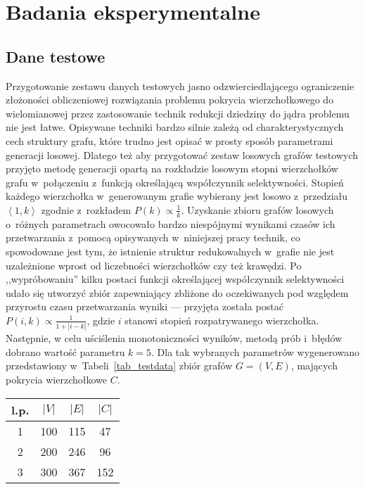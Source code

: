 \chapter{Badania eksperymentalne}
\label{results}
\section{Dane testowe}
\par{
  Przygotowanie zestawu danych testowych jasno odzwierciedlającego ograniczenie złożoności obliczeniowej rozwiązania problemu pokrycia wierzchołkowego do wielomianowej przez zastosowanie technik redukcji dziedziny do jądra problemu nie jest łatwe.
  Opisywane techniki bardzo silnie zależą od charakterystycznych cech struktury grafu, które trudno jest opisać w prosty sposób parametrami generacji losowej.
  Dlatego też aby przygotować zestaw losowych grafów testowych przyjęto metodę generacji opartą na rozkładzie losowym stopni wierzchołków grafu w~połączeniu z~funkcją określającą współczynnik selektywności.
  Stopień każdego wierzchołka w~generowanym grafie wybierany jest losowo z~przedziału $\left<1, k\right>$ zgodnie z~rozkładem $P(k) \propto \frac{1}{k}$.
  Uzyskanie zbioru grafów losowych o~różnych parametrach owocowało bardzo niespójnymi wynikami czasów ich przetwarzania z~pomocą opisywanych w~niniejszej pracy technik, co spowodowane jest tym, że istnienie struktur redukowalnych w~grafie nie jest uzależnione wprost od liczebności wierzchołków czy też krawędzi.
  Po ,,wypróbowaniu'' kilku postaci funkcji określającej współczynnik selektywności udało się utworzyć zbiór zapewniający zbliżone do oczekiwanych pod względem przyrostu czasu przetwarzania wyniki --- przyjęta została postać $P(i, k) \propto \frac{1}{1+|i-k|}$, gdzie $i$ stanowi stopień rozpatrywanego wierzchołka.
  Następnie, w celu uściślenia monotoniczności wyników, metodą prób i~błędów dobrano wartość parametru $k=5$.
  Dla tak wybranych parametrów wygenerowano przedstawiony w~Tabeli~\ref{tab_testdata} zbiór grafów $G=(V, E)$, mających pokrycia wierzchołkowe $C$.\\
  \begin{table}
    \begin{center}
    \begin{tabular}{| c | c | c | c |}
      \hline
      l.p. & $|V|$ & $|E|$ & $|C|$ \\ \hline
      1 & 100 & 115 & 47 \\
      2 & 200 & 246 & 96 \\
      3 & 300 & 367 & 152 \\

\end{tabular}
\end{center}
\end{table}}
